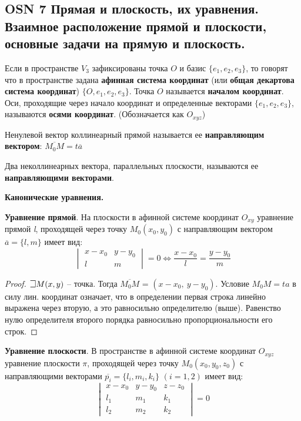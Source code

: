 \subsection{OSN 7 Прямая и плоскость, их уравнения. Взаимное расположение прямой и плоскости,  основные задачи на прямую и плоскость.}

Если в пространстве $V_3$ зафиксированы точка $O$ и базис $\{e_1, e_2, e_3\}$, то говорят что в пространстве задана \textbf{афинная система координат} (или \textbf{общая декартова система координат}) $\{O, e_1, e_2, e_3\}$. Точка $O$ называется \textbf{началом координат}. Оси, проходящие через начало координат и определенные векторами $\{e_1, e_2, e_3\}$, называются \textbf{осями координат}. (Обозначается как $O_{xyz}$)

Ненулевой вектор коллинеарный прямой называется ее \textbf{направляющим вектором}: $\overline{M_0M} = t \overline{a}$   

Два неколлинеарных вектора, параллельных плоскости, называются ее \textbf{направляющими векторами}. 


\bigbreak
\centerline{\textbf{Канонические уравнения.}}

\textbf{Уравнение прямой}. На плоскости в афинной системе координат $O_{xy}$ уравнение прямой \textit{l}, проходящей через точку $M_0(x_0,y_0)$ с направляющим вектором $\overline{a}=\{l,m\}$ имеет вид:
$$\begin{vmatrix} x-x_0 & y-y_0 \\ l & m \end{vmatrix} = 0 \iff \frac{x-x_0}{l} = \frac{y-y_0}{m} $$
\begin{proof}
$\mathLet M(x,y)$ -- точка. Тогда $\overline{M_0M}$ = $(x - x_0, ~ y - y_0)$. Условие $M_0M = ta$ в силу лин. координат означает, что в определении первая строка линейно выражена через вторую, а это равносильно определителю (выше). Равенство нулю определителя второго порядка равносильно пропорциональности его строк.
\end{proof}


\textbf{Уравнение плоскости}. 
В пространстве в афинной системе координат $O_{xyz}$ уравнение плоскости $\pi$, проходящей через точку $M_0(x_0,y_0,z_0)$ с направляющими векторами $\overline{p_i}=\{l_i,m_i,k_i\}$ $(i=1,2)$ имеет вид:
$$\begin{vmatrix} x-x_0 & y-y_0 & z-z_0\\ l_1 & m_1 & k_1 \\ l_2 & m_2 & k_2 \end{vmatrix} = 0 $$

